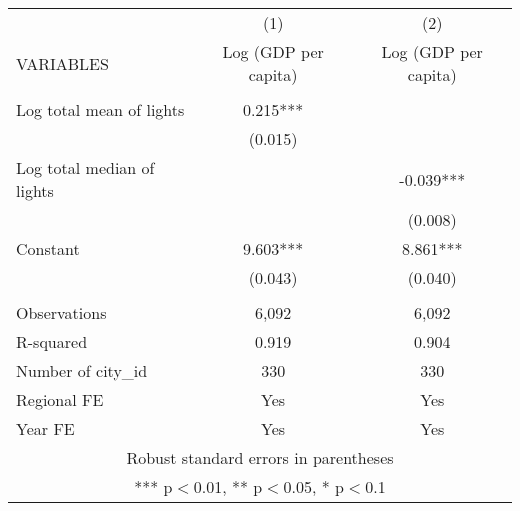 \documentclass[]{article}
\begin{document}
\begin{tabular}{lcc} \hline
 & (1) & (2) \\
VARIABLES & Log (GDP per capita) & Log (GDP per capita) \\ \hline
 &  &  \\
Log total mean of lights & 0.215*** &  \\
 & (0.015) &  \\
Log total median of lights &  & -0.039*** \\
 &  & (0.008) \\
Constant & 9.603*** & 8.861*** \\
 & (0.043) & (0.040) \\
 &  &  \\
Observations & 6,092 & 6,092 \\
R-squared & 0.919 & 0.904 \\
Number of city\_id & 330 & 330 \\
Regional FE & Yes & Yes \\
 Year FE & Yes & Yes \\ \hline
\multicolumn{3}{c}{ Robust standard errors in parentheses} \\
\multicolumn{3}{c}{ *** p$<$0.01, ** p$<$0.05, * p$<$0.1} \\
\end{tabular}
\end{document}
